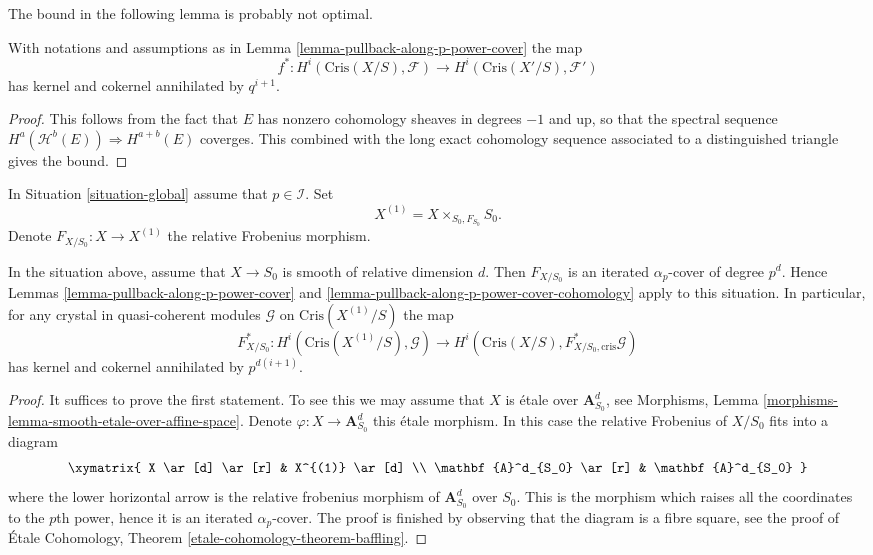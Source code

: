 \noindent
The bound in the following lemma is probably not optimal.

\begin{lemma}
\label{lemma-pullback-along-p-power-cover-cohomology}
With notations and assumptions as in
Lemma \ref{lemma-pullback-along-p-power-cover}
the map
$$
f^* :
H^i(\text{Cris}(X/S), \mathcal{F})
\longrightarrow
H^i(\text{Cris}(X'/S), \mathcal{F}')
$$
has kernel and cokernel annihilated by $q^{i + 1}$.
\end{lemma}

\begin{proof}
This follows from the fact that $E$ has nonzero cohomology sheaves in
degrees $-1$ and up, so that the spectral sequence
$H^a(\mathcal{H}^b(E)) \Rightarrow H^{a + b}(E)$ coverges.
This combined with the long exact cohomology sequence associated
to a distinguished triangle gives the bound.
\end{proof}

\noindent
In Situation \ref{situation-global} assume that $p \in \mathcal{I}$.
Set
$$
X^{(1)} = X \times_{S_0, F_{S_0}} S_0.
$$
Denote $F_{X/S_0} : X \to X^{(1)}$ the relative Frobenius morphism.

\begin{lemma}
\label{lemma-pullback-relative-frobenius}
In the situation above, assume that $X \to S_0$ is smooth of relative
dimension $d$. Then $F_{X/S_0}$ is an iterated $\alpha_p$-cover
of degree $p^d$. Hence Lemmas \ref{lemma-pullback-along-p-power-cover} and
\ref{lemma-pullback-along-p-power-cover-cohomology} apply to this
situation. In particular, for any crystal in quasi-coherent modules
$\mathcal{G}$ on $\text{Cris}(X^{(1)}/S)$ the map
$$
F_{X/S_0}^* : H^i(\text{Cris}(X^{(1)}/S), \mathcal{G})
\longrightarrow
H^i(\text{Cris}(X/S), F_{X/S_0, \text{cris}}^*\mathcal{G})
$$
has kernel and cokernel annihilated by $p^{d(i + 1)}$.
\end{lemma}

\begin{proof}
It suffices to prove the first statement. To see this we may assume
that $X$ is \'etale over $\mathbf{A}^d_{S_0}$, see
Morphisms, Lemma \ref{morphisms-lemma-smooth-etale-over-affine-space}.
Denote $\varphi : X \to \mathbf{A}^d_{S_0}$ this \'etale morphism.
In this case the relative Frobenius of $X/S_0$ fits into a diagram
$$
\xymatrix{
X \ar[d] \ar[r] & X^{(1)} \ar[d] \\
\mathbf{A}^d_{S_0} \ar[r] & \mathbf{A}^d_{S_0}
}
$$
where the lower horizontal arrow is the relative frobenius morphism
of $\mathbf{A}^d_{S_0}$ over $S_0$. This is the morphism which raises
all the coordinates to the $p$th power, hence it is an iterated
$\alpha_p$-cover. The proof is finished by observing that the diagram
is a fibre square, see the proof of
\'Etale Cohomology, Theorem \ref{etale-cohomology-theorem-baffling}.
\end{proof}













